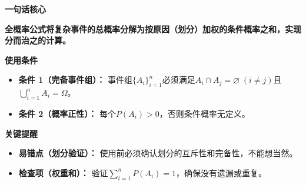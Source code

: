 \begin{summarybox}
	\textbf{\textcolor{CSummary}{一句话核心}}

	\textbf{全概率公式将复杂事件的总概率分解为按原因（划分）加权的条件概率之和，实现分而治之的计算。}

	\medskip
	\textbf{\textcolor{CSummary}{使用条件}}
	\begin{itemize}[leftmargin=*, itemsep=0.5em, topsep=0.4em]
		\item \textbf{条件 1（完备事件组）：} 事件组$\{A_i\}_{i=1}^n$必须满足$A_i\cap A_j=\varnothing\;(i\neq j)$且$\bigcup_{i=1}^n A_i=\Omega$。
		\item \textbf{条件 2（概率正性）：} 每个$P(A_i)>0$，否则条件概率无定义。
	\end{itemize}

	\medskip
	\textbf{\textcolor{CSummary}{关键提醒}}
	\begin{itemize}[leftmargin=*, itemsep=0.5em, topsep=0.4em]
		\item \textbf{易错点（划分验证）：} 使用前必须确认划分的互斥性和完备性，不能想当然。
		\item \textbf{检查项（权重和）：} 验证$\sum_{i=1}^n P(A_i)=1$，确保没有遗漏或重复。
	\end{itemize}
\end{summarybox}
